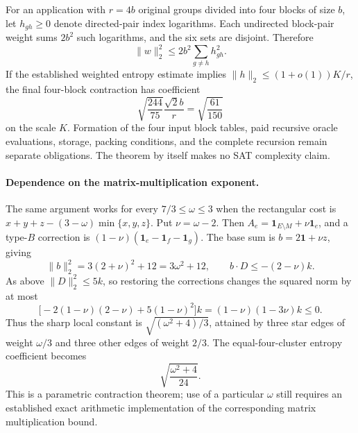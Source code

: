 For an application with $r=4b$ original groups divided into four blocks of
size $b$, let $h_{gh}\ge0$ denote directed-pair index logarithms. Each
undirected block-pair weight sums $2b^2$ such logarithms, and the six sets
are disjoint. Therefore
\[
 \|w\|_2^2\le2b^2\sum_{g\ne h}h_{gh}^2.
\]
If the established weighted entropy estimate implies
$\|h\|_2\le(1+o(1))K/r$, the final four-block contraction has coefficient
\[
 \sqrt{\frac{244}{75}}\frac{\sqrt2b}{r}
 =\sqrt{\frac{61}{150}}
\]
on the scale $K$. Formation of the four input block tables, paid recursive
oracle evaluations, storage, packing conditions, and the complete recursion
remain separate obligations. The theorem by itself makes no SAT complexity
claim.

\paragraph{Dependence on the matrix-multiplication exponent.}
The same argument works for every $7/3\le\omega\le3$ when the rectangular
cost is $x+y+z-(3-\omega)\min\{x,y,z\}$. Put $\nu=\omega-2$.
Then $A_e=\mathbf 1_{E\setminus M}+\nu\mathbf 1_e$, and a type-$B$
correction is $(1-\nu)(\mathbf 1_e-\mathbf 1_f-\mathbf 1_g)$.
The base sum is $b=2\mathbf 1+\nu z$, giving
\[
 \|b\|_2^2=3(2+\nu)^2+12=3\omega^2+12,
 \qquad b\mathbin\cdot D\le-(2-\nu)k.
\]
As above $\|D\|_2^2\le5k$, so restoring the corrections changes the
squared norm by at most
\[
 \bigl[-2(1-\nu)(2-\nu)+5(1-\nu)^2\bigr]k
 =(1-\nu)(1-3\nu)k\le0.
\]
Thus the sharp local constant is $\sqrt{(\omega^2+4)/3}$, attained by
three star edges of weight $\omega/3$ and three other edges of weight
$2/3$. The equal-four-cluster entropy coefficient becomes
\[
 \sqrt{\frac{\omega^2+4}{24}}.
\]
This is a parametric contraction theorem; use of a particular $\omega$
still requires an established exact arithmetic implementation of the
corresponding matrix multiplication bound.
